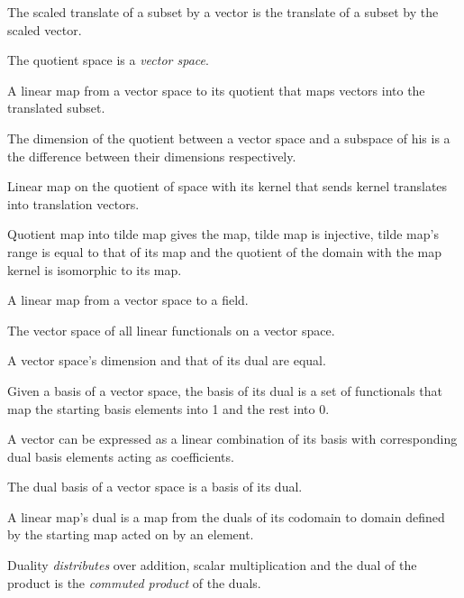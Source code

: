 \begin{multicols}{3}
  The scaled translate of a subset by a vector
  is the translate of a subset by the scaled vector.

  The quotient space is a \textit{vector space}.

  A linear map from a vector space to its quotient that maps vectors
  into the translated subset.

  The dimension of the quotient between a vector space and a subspace of his
  is a the difference between their dimensions respectively.

  Linear map on the quotient of space with its kernel that
  sends kernel translates into translation vectors.

  Quotient map into tilde map gives the map, tilde map is injective,
  tilde map's range is equal to that of its map and
  the quotient of the domain with the map kernel is isomorphic
  to its map.


  A linear map from a vector space to a field.

  The vector space of all linear functionals on a vector space.

  A vector space's dimension and that of its dual are equal.

  Given a basis of a vector space, the basis of its dual
  is a set of functionals that map the starting basis elements
  into 1 and the rest into 0.

  A vector can be expressed as a linear combination of its
  basis with corresponding dual basis elements acting as
  coefficients.

  The dual basis of a vector space is a basis of its dual.

  A linear map's dual is a map from the duals of its codomain
  to domain defined by the starting map acted on by an element.

  Duality \textit{distributes} over addition, scalar multiplication
  and the dual of the product is the \textit{commuted product} of the duals.


\end{multicols}
